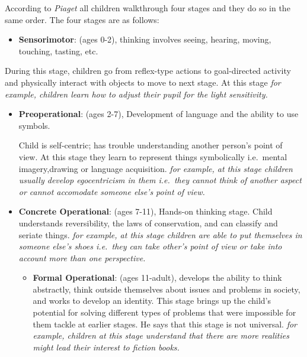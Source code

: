 \documentclass[11pt]{article}
\providecommand{\tightlist}{%
      \setlength{\itemsep}{0pt}\setlength{\parskip}{0pt}}
\begin{document}
According to \emph{Piaget} all children walkthrough four stages and they
do so in the same order. The four stages are as follows:

\begin{itemize}
\tightlist
\item
  \textbf{Sensorimotor}: (ages 0-2), thinking involves seeing, hearing,
  moving, touching, tasting, etc.
\end{itemize}

During this stage, children go from reflex-type actions to goal-directed
activity and physically interact with objects to move to next stage. At
this stage \emph{for example, children learn how to adjust their pupil
for the light sensitivity.}

\begin{itemize}
\item
  \textbf{Preoperational}: (ages 2-7), Development of language and the
  ability to use symbols.

  Child is self-centric; has trouble understanding another person's
  point of view. At this stage they learn to represent things
  symbolically i.e.~mental imagery,drawing or language acquisition.
  \emph{for example, at this stage children usually develop
  egocentricism in them i.e.~they cannot think of another aspect or
  cannot accomodate someone else's point of view.}
\item
  \textbf{Concrete Operational}: (ages 7-11), Hands-on thinking stage.
  Child understands reversibility, the laws of conservation, and can
  classify and seriate things. \emph{for example, at this stage children
  are able to put themselves in someone else's shoes i.e.~they can take
  other's point of view or take into account more than one perspective.}

  \begin{itemize}
  \tightlist
  \item
    \textbf{Formal Operational}: (ages 11-adult), develops the ability
    to think abstractly, think outside themselves about issues and
    problems in society, and works to develop an identity. This stage
    brings up the child's potential for solving different types of
    problems that were impossible for them tackle at earlier stages. He
    says that this stage is not universal. \emph{for example, children
    at this stage understand that there are more realities might lead
    their interest to fiction books.}
  \end{itemize}
\end{itemize}
\end{document}
